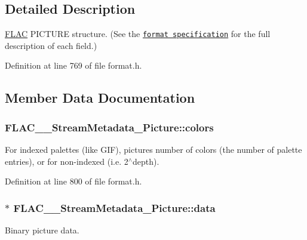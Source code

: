 \subsection{Detailed Description}
\hyperlink{namespace_f_l_a_c}{F\+L\+AC} P\+I\+C\+T\+U\+RE structure. (See the \href{../format.html#metadata_block_picture}{\tt format specification} for the full description of each field.) 

Definition at line 769 of file format.\+h.



\subsection{Member Data Documentation}
\subsubsection[{\texorpdfstring{colors}{colors}}]{ F\+L\+A\+C\+\_\+\+\_\+\+Stream\+Metadata\+\_\+\+Picture\+::colors}\hypertarget{struct_f_l_a_c_____stream_metadata___picture_af17c1738bab67eba049ee101acfd36f0}{}\label{struct_f_l_a_c_____stream_metadata___picture_af17c1738bab67eba049ee101acfd36f0}
For indexed palettes (like G\+IF), picture\textquotesingle{}s number of colors (the number of palette entries), or {} for non-\/indexed (i.\+e. 2$^\wedge$depth). 

Definition at line 800 of file format.\+h.

\subsubsection[{\texorpdfstring{data}{data}}]{$\ast$ F\+L\+A\+C\+\_\+\+\_\+\+Stream\+Metadata\+\_\+\+Picture\+::data}\hypertarget{struct_f_l_a_c_____stream_metadata___picture_a9c71b5d77920e6d3aee6893795c43605}{}\label{struct_f_l_a_c_____stream_metadata___picture_a9c71b5d77920e6d3aee6893795c43605}
Binary picture data. 

